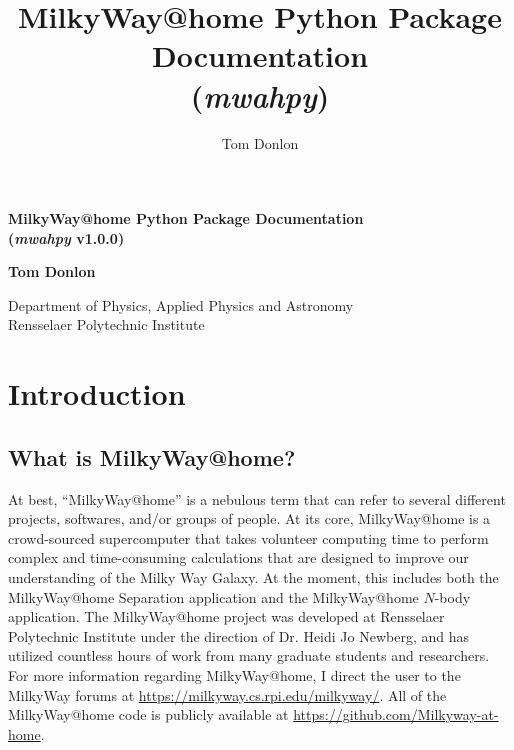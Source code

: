 \documentclass{article}
\author{Tom Donlon}
\title{MilkyWay@home Python Package Documentation \\ (\textit{mwahpy})}
\date{}
\begin{document}
\newcommand{\mwahpy}[0]{\textit{mwahpy }}
\newcommand{\msol}{$M_\odot$}

\begin{titlepage}
   \begin{center}
       \vspace*{5cm}

       \huge\textbf{MilkyWay@home Python Package Documentation \\ (\textit{mwahpy} v1.0.0)}

       \vspace{0.5cm}
        
            
       \vspace{1.5cm}

       \large\textbf{Tom Donlon}
            
       \vspace{0.8cm}
            
       Department of Physics, Applied Physics and Astronomy\\
       Rensselaer Polytechnic Institute
            
   \end{center}
\end{titlepage}

\newpage

\tableofcontents

\newpage

\section{Introduction}

\subsection{What is MilkyWay@home?}

At best, ``MilkyWay@home'' is a nebulous term that can refer to several different projects, softwares, and/or groups of people. At its core, MilkyWay@home is a crowd-sourced supercomputer that takes volunteer computing time to perform complex and time-consuming calculations that are designed to improve our understanding of the Milky Way Galaxy. At the moment, this includes both the MilkyWay@home Separation application and the MilkyWay@home $N$-body application. The MilkyWay@home project was developed at Rensselaer Polytechnic Institute under the direction of Dr. Heidi Jo Newberg, and has utilized countless hours of work from many graduate students and researchers. For more information regarding MilkyWay@home, I direct the user to the MilkyWay forums at \url{https://milkyway.cs.rpi.edu/milkyway/}. All of the MilkyWay@home code is publicly available at \url{https://github.com/Milkyway-at-home}. 
\end{document}
